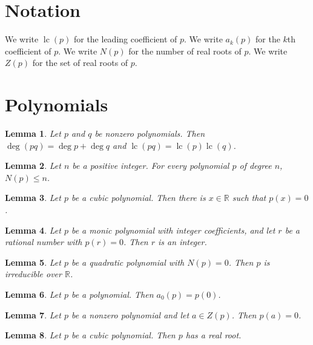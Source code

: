 \documentclass{article}
\newtheorem{lemma}{Lemma}
\begin{document}
\section{Notation}

We write $\operatorname{lc}(p)$ for the leading coefficient of $p$.
We write $a_k(p)$ for the $k$th coefficient of $p$.
We write $N(p)$ for the number of real roots of $p$.
We write $Z(p)$ for the set of real roots of $p$.

\section{Polynomials}

\begin{lemma}\label{product}
Let $p$ and $q$ be nonzero polynomials. Then $\deg(pq)=\deg p+\deg q$ and $\operatorname{lc}(pq)=\operatorname{lc}(p)\operatorname{lc}(q)$.
\end{lemma}

\begin{lemma}\label{roots}
Let $n$ be a positive integer. For every polynomial $p$ of degree $n$, $N(p)\le n$.
\end{lemma}

\begin{lemma}\label{odd}
Let $p$ be a cubic polynomial. Then there is $x\in\mathbb{R}$ such that $p(x)=0$.
\end{lemma}

\begin{lemma}\label{monic}
Let $p$ be a monic polynomial with integer coefficients, and let $r$ be a rational number with $p(r)=0$. Then $r$ is an integer.
\end{lemma}

\begin{lemma}\label{irreducible}
Let $p$ be a quadratic polynomial with $N(p)=0$. Then $p$ is irreducible over $\mathbb{R}$.
\end{lemma}

\begin{lemma}\label{coefficients}
Let $p$ be a polynomial. Then $a_0(p)=p(0)$.
\end{lemma}

\begin{lemma}\label{set}
Let $p$ be a nonzero polynomial and let $a\in Z(p)$. Then $p(a)=0$.
\end{lemma}

\begin{lemma}\label{cubic-root}
Let $p$ be a cubic polynomial. Then $p$ has a real root.
\end{lemma}
\end{document}

